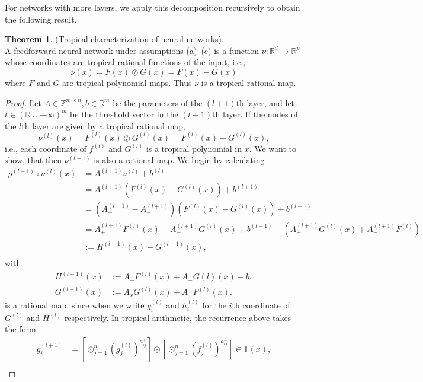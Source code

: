 \documentclass{article}
\theoremstyle{definition}
\newtheorem{theorem}{Theorem}[section]
\begin{document}
For networks with more layers, we apply this decomposition recursively to obtain the following result.

\begin{theorem}\cite{zhang2018tropical}
\label{teo:trop_char_of_neur_net}
(Tropical characterization of neural networks). \\
A feedforward neural network under assumptions (a)–(c)
is a function $\nu : \mathbb{R}^{d} \to \mathbb{R}^{p}$ whose coordinates are tropical rational functions of the input, i.e.,
$$ \nu(x) = F(x) \oslash G(x) = F(x) - G(x) $$
where $F$ and $G$ are tropical polynomial maps. Thus $\nu$ is a tropical rational map.
\end{theorem}
\begin{proof}
Let $A \in \mathbb{Z}^{m \times n}, b \in \mathbb{R}^{m}$ be the parameters of the $(l+1)$th layer, and let $t \in (\mathbb{R} \cup {- \infty})^{m}$ be the threshold vector in the $(l+1)$th layer. If the nodes of the $l$th layer are given by a tropical rational map,
$$ \nu^{(l)}(x) = F^{(l)}(x) \oslash G^{(l)}(x) = F^{(l)}(x)-G^{(l)}(x),$$
i.e., each coordinate of $f^{(l)}$ and $G^{(l)}$ is a tropical polynomial in $x$. We want to show, that then $\nu^{(l+1)}$ is also a rational map. We begin by calculating
\begin{align*}
\rho^{(l+1)} \circ \nu^{(l)}(x)
&= A^{(l+1)} \nu^{(l)} + b^{(l)} \\
&= A^{(l+1)}(F^{(l)}(x) - G^{(l)}(x)) + b^{(l+1)} \\
&=(A^{(l+1)}_{+} - A^{(l+1)}_{-})(F^{(l)}(x) - G^{(l)}(x)) + b^{(l+1)} \\
&=A_{+}^{(l+1)}F^{(l)}(x) + A_{-}^{(l+1)}G^{(l)}(x) + b^{(l+1)} - (A_{+}^{(l+1)}G^{(l)}(x) + A_{-}^{(l+1)}F^{(l)})\\
&:=  H^{(l+1)}(x) - G^{(l+1)}(x), \\
\end{align*}
with
\begin{align*}
H^{(l+1)}(x) &:= A_{+}F^{(l)}(x) + A_{-}G{(l)}(x) +b, \\
G^{(l+1)}(x) &:= A_{x}G^{(l)}(x) + A_{-}F^{(l)}(x).
\end{align*}
is a rational map, since when we write $g_{i}^{(l)}$ and $h_{i}^{(l)}$ for the $i$th coordinate of $G^{(l)}$ and $H^{(l)}$ respectively. In tropical arithmetic, the recurrence above takes the form
\begin{align*}
g_{i}^{(l+1)} &= [\odot^{n}_{j=1}(g_j^{(l)})^{a_{ij}^{+}}] \odot [\odot^{n}_{j=1}(f_j^{(l)})^{a_{ij}^{-}}] \in \mathbb{T}(x), \\

\end{align*}
\end{proof}
\end{document}
